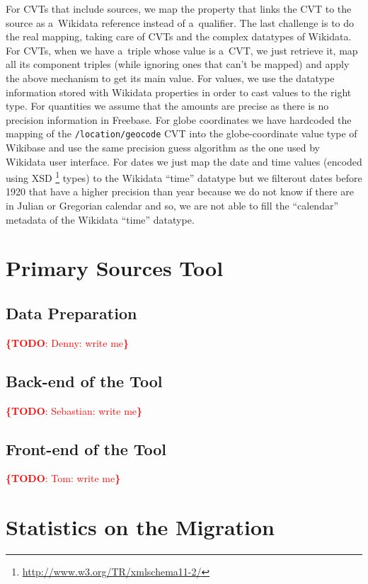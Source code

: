 \documentclass{sig-alternate}
\newcommand{\todo}[1]{\noindent\textcolor{red}{{\bf \{TODO}: #1{\bf \}}}}
\begin{document}
For CVTs that include sources, we map the property that links the CVT
to the source as a~Wikidata reference instead of a~qualifier.
The last challenge is to do the real mapping, taking care of CVTs
and the complex datatypes of Wikidata.
For CVTs, when we have a~triple whose value is a~CVT, we just retrieve it,
map all its component triples (while ignoring ones that can't be mapped)
and apply the above mechanism to get its main value.
For values, we use the datatype information stored with Wikidata properties
in order to cast values to the right type.
For quantities we assume that the amounts are precise
as there is no precision information in Freebase.
For globe coordinates we have hardcoded the mapping of the \texttt{/location/geocode} CVT
into the globe-coordinate value type of Wikibase
and use the same precision guess algorithm as the one used by Wikidata user interface.
For dates we just map the date and time values (encoded using XSD%
\footnote{\url{ http://www.w3.org/TR/xmlschema11-2/}} types)
to the Wikidata ``time'' datatype but we filterout dates before 1920 that have
a higher precision than year because we do not know
if there are in Julian or Gregorian calendar and so,
we are not able to fill the ``calendar'' metadata of the Wikidata ``time'' datatype.

\section{Primary Sources Tool}\label{sec:primary-sources-tool}

\subsection{Data Preparation}

\todo{Denny: write me}

\subsection{Back-end of the Tool}

\todo{Sebastian: write me}

\subsection{Front-end of the Tool}

\todo{Tom: write me}

\section{Statistics on the Migration}\label{sec:statistics-of-the-migration}
\end{document}
